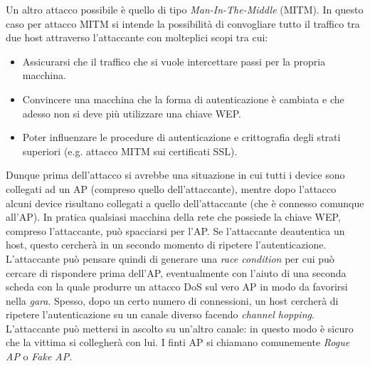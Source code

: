 Un altro attacco possibile è quello di tipo \textit{Man-In-The-Middle} (MITM). In questo caso per attacco MITM si intende la possibilità di convogliare tutto il traffico tra due host attraverso l'attaccante con molteplici scopi tra cui:
\begin{itemize}
	\item Assicurarsi che il traffico che si vuole intercettare passi per la propria macchina.
	\item Convincere una macchina che la forma di autenticazione è cambiata e che adesso non si deve più utilizzare una chiave WEP.
	\item Poter influenzare le procedure di autenticazione e crittografia degli strati superiori (e.g. attacco MITM sui certificati SSL).
\end{itemize}
Dunque prima dell'attacco si avrebbe una situazione in cui tutti i device sono collegati ad un AP (compreso quello dell'attaccante), mentre dopo l'attacco alcuni device risultano collegati a quello dell'attaccante (che è connesso comunque all'AP). In pratica qualsiasi macchina della rete che possiede la chiave WEP, compreso l'attaccante, può spacciarsi per l'AP. Se l'attaccante deautentica un host, questo cercherà in un secondo momento di ripetere l'autenticazione. L'attaccante può pensare quindi di generare una \textit{race condition} per cui può cercare di rispondere prima dell'AP, eventualmente con l'aiuto di una seconda scheda con la quale produrre un attacco DoS sul vero AP in modo da favorirsi nella \textit{gara}. Spesso, dopo un certo numero di connessioni, un host cercherà di ripetere l'autenticazione su un canale diverso facendo \textit{channel hopping}. L'attaccante può mettersi in ascolto su un'altro canale: in questo modo è sicuro che la vittima si collegherà con lui. I finti AP si chiamano comunemente \textit{Rogue AP} o \textit{Fake AP}.\\

